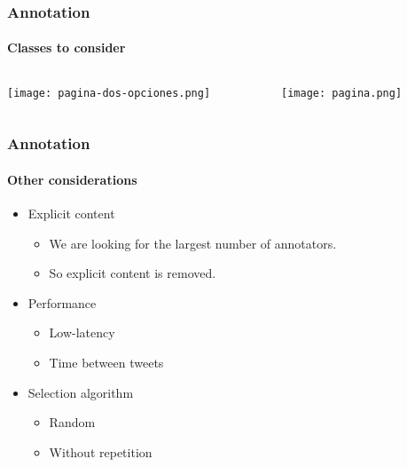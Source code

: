 \begin{frame}
\frametitle{Annotation}
\framesubtitle{Classes to consider}
        \begin{center}
        \begin{columns}[c]
            \begin{column}[c]{0.50\textwidth}
                \centering
                \texttt{[image: pagina-dos-opciones.png]}
            \end{column}

            \begin{column}[c]{0.50\textwidth}
                \centering
                \texttt{[image: pagina.png]}
            \end{column}
        \end{columns}
    \end{center}
\end{frame}
\begin{frame}
    \frametitle{Annotation}
    \framesubtitle{Other considerations}

    \begin{itemize}
        \item Explicit content

        \begin{itemize}
            \item We are looking for the largest number of annotators.
            \item So explicit content is removed.
        \end{itemize}

        \item Performance

        \begin{itemize}
            \item Low-latency
            \item Time between tweets
        \end{itemize}

        \item Selection algorithm

        \begin{itemize}
            \item Random
            \item Without repetition
        \end{itemize}
    \end{itemize}
\end{frame}
